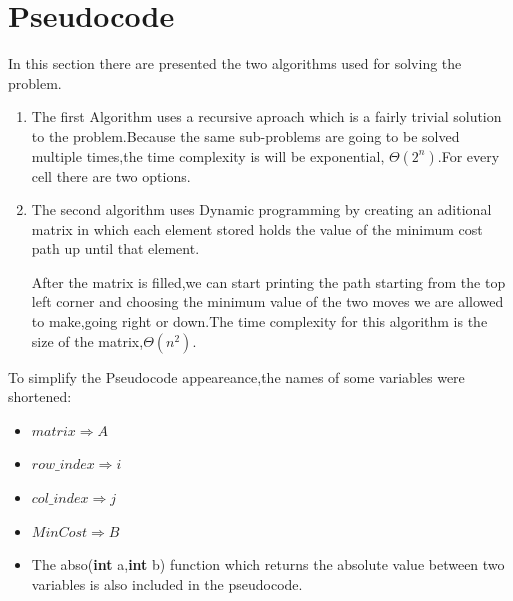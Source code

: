 \documentclass{article}
\begin{document}
\section {\LARGE Pseudocode}
\Large \par In this section there are presented the two algorithms used for solving the problem.
\begin{enumerate}
  \item The first Algorithm uses a recursive aproach which is a fairly trivial solution to the problem.Because the same sub-problems are going to be 
  solved multiple times,the time complexity is will be exponential,
  $\Theta (2^n)$.For every cell there are two options.

  \item The second algorithm uses Dynamic programming by creating an aditional 
  matrix in which each element stored holds the value of the minimum cost path
  up until that element.\par After the matrix is filled,we can start printing the 
  path starting from the top left corner and choosing the minimum value of the 
  two moves we are allowed to make,going right or down.The time complexity for
  this algorithm is the size of the matrix,$\Theta(n^2)$.
  
\end{enumerate}
\par To simplify the Pseudocode appeareance,the names of some variables were shortened: 
\begin{itemize}
  \item $matrix \Rightarrow A $
  \item $row\_ index \Rightarrow i $
  \item $col\_ index \Rightarrow j $
  \item $MinCost \Rightarrow B $
  \item The abso(\textbf{int} a,\textbf{int} b) function which returns the absolute value between two variables is also included in the pseudocode.
\end{itemize}
\end{document}
